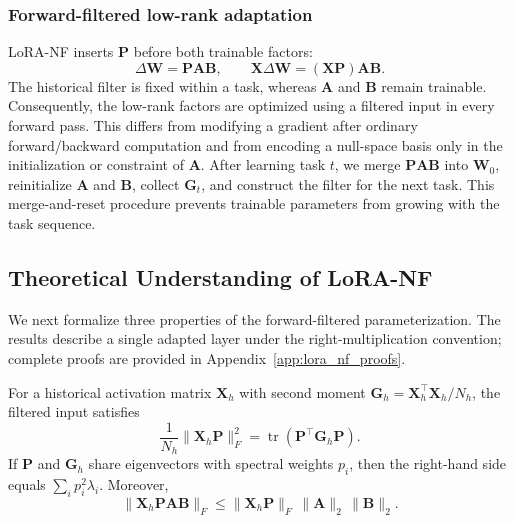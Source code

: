 \subsubsection{Forward-filtered low-rank adaptation}

LoRA-NF inserts $\mathbf{P}$ before both trainable factors:
\begin{equation}
    \Delta\mathbf{W}=\mathbf{P}\mathbf{A}\mathbf{B},
    \qquad
    \mathbf{X}\Delta\mathbf{W}=(\mathbf{X}\mathbf{P})\mathbf{A}\mathbf{B}.
    \label{eq:lora_nf}
\end{equation}
The historical filter is fixed within a task, whereas $\mathbf{A}$ and $\mathbf{B}$ remain trainable. Consequently, the low-rank factors are optimized using a filtered input in every forward pass. This differs from modifying a gradient after ordinary forward/backward computation and from encoding a null-space basis only in the initialization or constraint of $\mathbf{A}$. After learning task $t$, we merge $\mathbf{P}\mathbf{A}\mathbf{B}$ into $\mathbf{W}_0$, reinitialize $\mathbf{A}$ and $\mathbf{B}$, collect $\mathbf{G}_t$, and construct the filter for the next task. This merge-and-reset procedure prevents trainable parameters from growing with the task sequence.

\subsection{Theoretical Understanding of LoRA-NF}
\label{sec:lora_nf_theory}

We next formalize three properties of the forward-filtered parameterization. The results describe a single adapted layer under the right-multiplication convention; complete proofs are provided in Appendix~\ref{app:lora_nf_proofs}.

\begin{proposition}
\label{prop:historical_response}
For a historical activation matrix $\mathbf{X}_h$ with second moment $\mathbf{G}_h=\mathbf{X}_h^\top\mathbf{X}_h/N_h$, the filtered input satisfies
\begin{equation}
    \frac{1}{N_h}\|\mathbf{X}_h\mathbf{P}\|_F^2
    =\operatorname{tr}(\mathbf{P}^\top\mathbf{G}_h\mathbf{P}).
    \label{eq:filtered_energy}
\end{equation}
If $\mathbf{P}$ and $\mathbf{G}_h$ share eigenvectors with spectral weights $p_i$, then the right-hand side equals $\sum_i p_i^2\lambda_i$. Moreover,
\begin{equation}
    \|\mathbf{X}_h\mathbf{P}\mathbf{A}\mathbf{B}\|_F
    \leq \|\mathbf{X}_h\mathbf{P}\|_F\,\|\mathbf{A}\|_2\,\|\mathbf{B}\|_2.
    \label{eq:historical_bound}
\end{equation}
\end{proposition}

